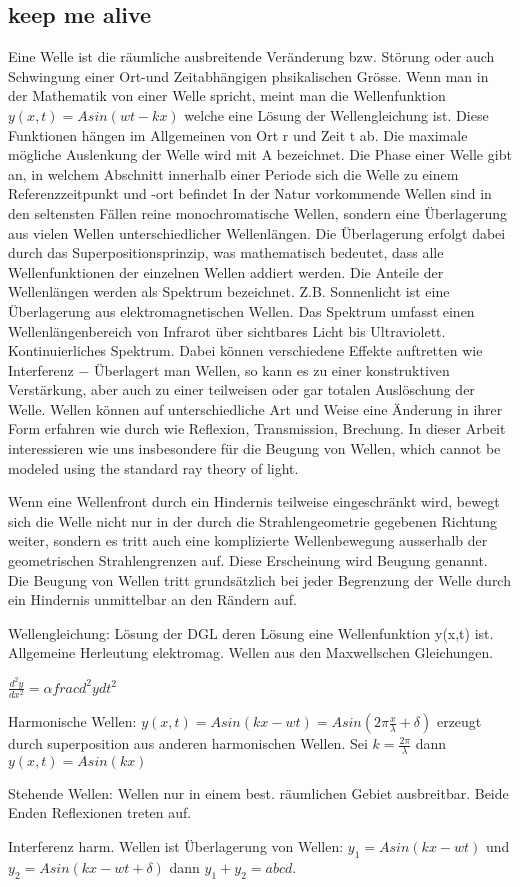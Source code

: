 \subsection{keep me alive}
Eine Welle ist die räumliche ausbreitende Veränderung bzw. Störung oder auch Schwingung einer Ort-und Zeitabhängigen phsikalischen Grösse. Wenn man in der Mathematik von einer Welle spricht, meint man die Wellenfunktion $y(x,t) = A sin(wt - kx)$ welche eine Lösung der Wellengleichung ist. Diese Funktionen hängen im Allgemeinen von Ort r und Zeit t ab.
Die maximale mögliche Auslenkung der Welle wird mit A bezeichnet. Die Phase einer Welle gibt an, in welchem Abschnitt innerhalb einer Periode sich die Welle zu einem Referenzzeitpunkt und -ort befindet
In der Natur vorkommende Wellen sind in den seltensten Fällen reine monochromatische Wellen, sondern eine Überlagerung aus vielen Wellen unterschiedlicher Wellenlängen. Die Überlagerung erfolgt dabei durch das Superpositionsprinzip, was mathematisch bedeutet, dass alle Wellenfunktionen der einzelnen Wellen addiert werden. Die Anteile der Wellenlängen werden als Spektrum bezeichnet. Z.B. Sonnenlicht ist eine Überlagerung aus elektromagnetischen Wellen. Das Spektrum umfasst einen Wellenlängenbereich von Infrarot über sichtbares Licht bis Ultraviolett. Kontinuierliches Spektrum. 
Dabei können verschiedene Effekte auftretten wie Interferenz − Überlagert man Wellen, so kann es zu einer konstruktiven Verstärkung, aber auch zu einer teilweisen oder gar totalen Auslöschung der Welle.
Wellen können auf unterschiedliche Art und Weise eine Änderung in ihrer Form erfahren wie durch wie Reflexion, Transmission, Brechung. In dieser Arbeit interessieren wie uns insbesondere für die Beugung von Wellen, which cannot be modeled using the standard ray theory of light.

Wenn eine Wellenfront durch ein Hindernis teilweise eingeschränkt wird, bewegt sich die Welle nicht nur in der durch die Strahlengeometrie gegebenen Richtung weiter, sondern es tritt auch eine komplizierte Wellenbewegung ausserhalb der geometrischen Strahlengrenzen auf. Diese Erscheinung wird Beugung genannt. Die Beugung von Wellen tritt grundsätzlich bei jeder Begrenzung der Welle durch ein Hindernis unmittelbar an den Rändern auf. 



Wellengleichung: Lösung der DGL deren Lösung eine Wellenfunktion y(x,t) ist. Allgemeine Herleutung elektromag. Wellen aus den Maxwellschen Gleichungen.

$\frac{d^2 y}{dx^2} = \alpha frac{d^2 y}{dt^2}$

Harmonische Wellen: $y(x,t) = A sin(kx - wt) = A sin(2\pi \frac{x}{\lambda} + \delta)$ erzeugt durch superposition aus anderen harmonischen Wellen. Sei $k = \frac{2 \pi}{\lambda}$ dann $y(x,t) = A sin(kx)$

Stehende Wellen: Wellen nur in einem best. räumlichen Gebiet ausbreitbar. Beide Enden Reflexionen treten auf.

Interferenz harm. Wellen ist Überlagerung von Wellen: $y_1 = A sin(kx - wt)$ und $y_2 = A sin(kx - wt + \delta)$ dann $y_1 + y_2 = abcd$.